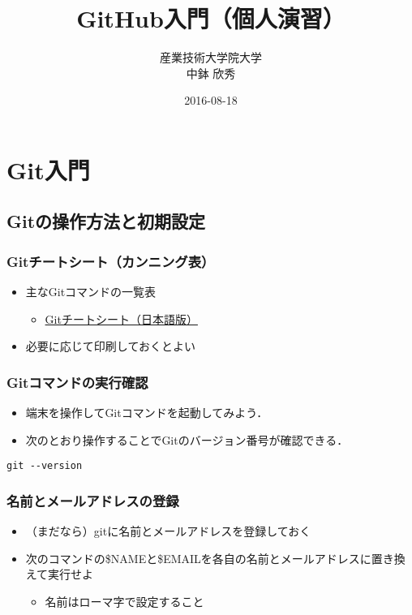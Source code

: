 \documentclass[a4paper,twoside,twocolumn]{bxjsarticle}
\author{産業技術大学院大学\\ 中鉢 欣秀}
\date{2016-08-18}
\title{GitHub入門（個人演習）}
\begin{document}
\maketitle

\section{Git入門}
\label{sec-1}
\subsection{Gitの操作方法と初期設定}
\label{sec-1-1}
\subsubsection{Gitチートシート（カンニング表）}
\label{sec-1-1-1}
\begin{itemize}
\item 主なGitコマンドの一覧表
\begin{itemize}
\item \href{https://services.github.com/kit/downloads/ja/github-git-cheat-sheet.pdf}{Gitチートシート（日本語版）}
\end{itemize}
\item 必要に応じて印刷しておくとよい
\end{itemize}

\subsubsection{Gitコマンドの実行確認}
\label{sec-1-1-2}
\begin{itemize}
\item 端末を操作してGitコマンドを起動してみよう．
\item 次のとおり操作することでGitのバージョン番号が確認できる．
\end{itemize}

\begin{verbatim}
git --version
\end{verbatim}

\subsubsection{名前とメールアドレスの登録}
\label{sec-1-1-3}
\begin{itemize}
\item （まだなら）gitに名前とメールアドレスを登録しておく
\item 次のコマンドの\$NAMEと\$EMAILを各自の名前とメールアドレスに置き換えて実行せよ
\begin{itemize}
\item 名前はローマ字で設定すること
\end{itemize}
\end{itemize}
\end{document}
